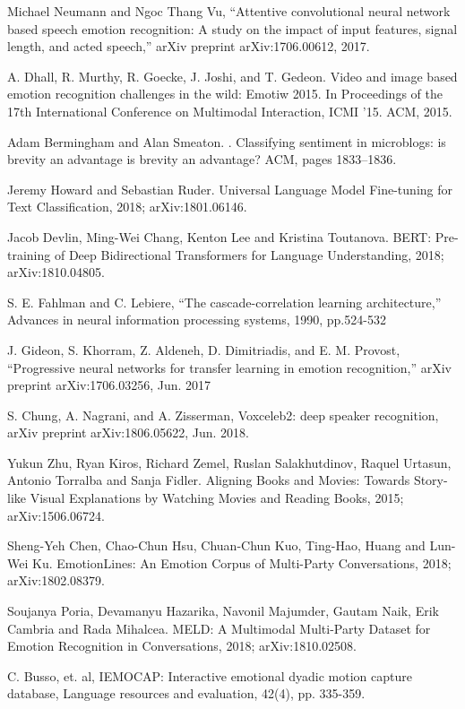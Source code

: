 \documentclass{article}
\begin{document}
\begin{thebibliography}{1}
Michael Neumann and Ngoc Thang Vu, 
\newblock “Attentive convolutional neural network based speech emotion recognition: A study on the impact of input features, signal length, and acted speech,” 
\newblock arXiv preprint arXiv:1706.00612, 2017. 

A. Dhall, R. Murthy, R. Goecke, J. Joshi, and T. Gedeon.
\newblock Video and image based emotion recognition challenges in the wild: Emotiw 2015. 
\newblock In Proceedings of the 17th International Conference on Multimodal Interaction, ICMI ’15. ACM, 2015.

Adam Bermingham and Alan Smeaton. 
. 
\newblock Classifying sentiment in microblogs: is brevity an advantage is brevity an advantage? ACM, pages 1833–1836.

Jeremy Howard and Sebastian Ruder.
\newblock Universal Language Model Fine-tuning for Text Classification, 2018;
\newblock arXiv:1801.06146.

Jacob Devlin, Ming-Wei Chang, Kenton Lee and Kristina Toutanova.
\newblock BERT: Pre-training of Deep Bidirectional Transformers for Language Understanding, 2018;
\newblock arXiv:1810.04805.

S. E. Fahlman and C. Lebiere, 
\newblock “The cascade-correlation learning architecture,” 
\newblock Advances in neural information processing systems, 1990, pp.524-532

J. Gideon, S. Khorram, Z. Aldeneh, D. Dimitriadis, and E. M. Provost,
\newblock “Progressive neural networks for transfer learning in emotion recognition,” 
\newblock arXiv preprint arXiv:1706.03256, Jun. 2017

S. Chung, A. Nagrani, and A. Zisserman,  
\newblock Voxceleb2: deep speaker recognition,
\newblock arXiv preprint arXiv:1806.05622, Jun. 2018.

Yukun Zhu, Ryan Kiros, Richard Zemel, Ruslan Salakhutdinov, Raquel Urtasun, Antonio Torralba and Sanja Fidler.
\newblock Aligning Books and Movies: Towards Story-like Visual Explanations by Watching Movies and Reading Books, 2015;
\newblock arXiv:1506.06724.

Sheng-Yeh Chen, Chao-Chun Hsu, Chuan-Chun Kuo,  Ting-Hao,  Huang and Lun-Wei Ku.
\newblock EmotionLines: An Emotion Corpus of Multi-Party Conversations, 2018;
\newblock arXiv:1802.08379.

Soujanya Poria, Devamanyu Hazarika, Navonil Majumder, Gautam Naik, Erik Cambria and Rada Mihalcea.
\newblock MELD: A Multimodal Multi-Party Dataset for Emotion Recognition in Conversations, 2018;
\newblock arXiv:1810.02508.

C. Busso, et. al,  
\newblock IEMOCAP: Interactive emotional dyadic motion capture database,  
\newblock Language resources and evaluation, 42(4), pp. 335-359.

\end{thebibliography}
\end{document}
